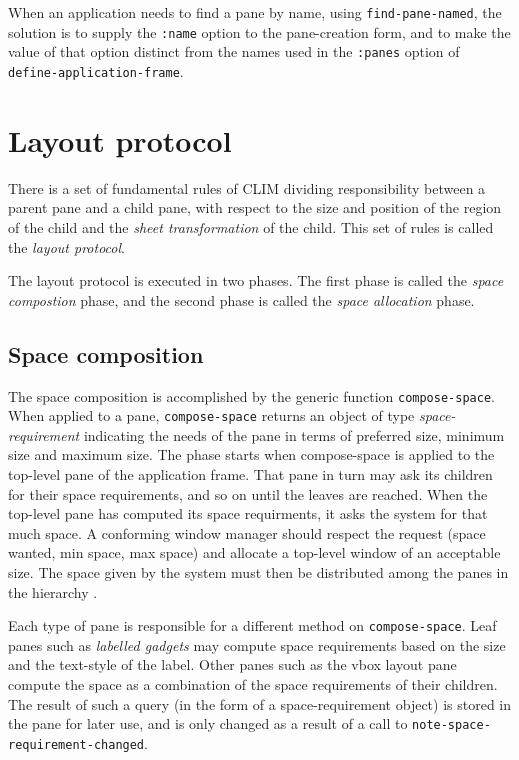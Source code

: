 When an application needs to find a pane by name, using
\texttt{find-pane-named},  the solution is to supply the
\texttt{:name} option to the pane-creation form, and to make the value
of that option distinct from the names used in the \texttt{:panes}
option of \texttt{define-application-frame}.

\section{Layout protocol}

There is a set of fundamental rules of CLIM dividing responsibility
between a parent pane and a child pane, with respect to the size and
position of the region of the child and the \emph{sheet transformation}
of the child.  This set of rules is called the \emph{layout protocol}.

The layout protocol is executed in two phases.  The first phase is
called the \emph{space compostion} phase, and the second phase is
called the \emph{space allocation} phase.

\subsection{Space composition}

The space composition is accomplished by the generic function
\texttt{compose-space}.  When applied to a pane, \texttt{compose-space}
returns an object of type \emph{space-requirement} indicating the needs
of the pane in terms of preferred size, minimum size and maximum size.
The phase starts when compose-space is applied to the top-level pane of
the application frame.  That pane in turn may ask its children for their
space requirements, and so on until the leaves are reached.  When the
top-level pane has computed its space requirments, it asks the system
for that much space.  A conforming window manager should respect the
request (space wanted, min space, max space) and allocate a top-level
window of an acceptable size.  The space given by the system must then
be distributed among the panes in the hierarchy
.

Each type of pane is responsible for a different method on
\texttt{compose-space}.  Leaf panes such as \emph{labelled gadgets} may
compute space requirements based on the size and the text-style of the
label.  Other panes such as the vbox layout pane compute the space as a
combination of the space requirements of their children.  The result of
such a query (in the form of a space-requirement object) is stored in
the pane for later use, and is only changed as a result of a call to
\texttt{note-space-requirement-changed}.

